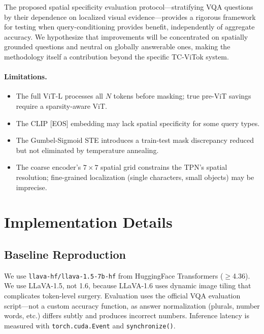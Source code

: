 \documentclass[11pt,a4paper]{article}
\begin{document}
The proposed spatial specificity evaluation protocol---stratifying VQA questions
by their dependence on localized visual evidence---provides a rigorous framework
for testing when query-conditioning provides benefit, independently of aggregate
accuracy. We hypothesize that improvements will be concentrated on spatially
grounded questions and neutral on globally answerable ones, making the methodology
itself a contribution beyond the specific TC-ViTok system.

\paragraph{Limitations.}
\begin{itemize}[leftmargin=2em, itemsep=1pt]
  \item The full ViT-L processes all $N$ tokens before masking; true pre-ViT
    savings require a sparsity-aware ViT.
  \item The CLIP [EOS] embedding may lack spatial specificity for some query
    types.
  \item The Gumbel-Sigmoid STE introduces a train-test mask discrepancy reduced
    but not eliminated by temperature annealing.
  \item The coarse encoder's $7{\times}7$ spatial grid constrains the TPN's
    spatial resolution; fine-grained localization (single characters, small
    objects) may be imprecise.
\end{itemize}

\appendix
\section{Implementation Details}
\label{app:implementation}

\subsection{Baseline Reproduction}

We use \texttt{llava-hf/llava-1.5-7b-hf} from HuggingFace Transformers
($\geq$4.36). We use LLaVA-1.5, not 1.6, because LLaVA-1.6 uses dynamic image
tiling that complicates token-level surgery. Evaluation uses the official VQA
evaluation script---not a custom accuracy function, as answer normalization
(plurals, number words, etc.) differs subtly and produces incorrect numbers.
Inference latency is measured with \texttt{torch.cuda.Event} and
\texttt{synchronize()}.
\end{document}
